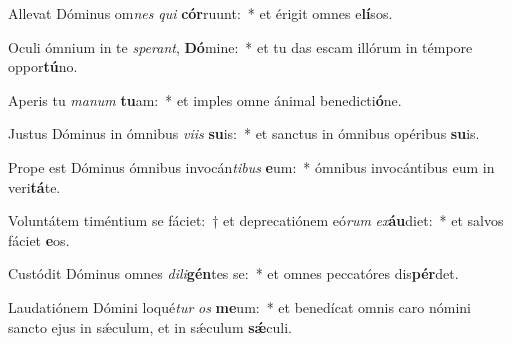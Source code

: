 \item Allevat Dóminus om\textit{nes} \textit{qui} \textbf{cór}ruunt:~* et érigit omnes e\textbf{lí}sos.
\item Oculi ómnium in te \textit{spe}\textit{rant}, \textbf{Dó}mine:~* et tu das escam illórum in témpore oppor\textbf{tú}no.
\item Aperis tu \textit{ma}\textit{num} \textbf{tu}am:~* et imples omne ánimal benedicti\textbf{ó}ne.
\item Justus Dóminus in ómnibus \textit{vi}\textit{is} \textbf{su}is:~* et sanctus in ómnibus opéribus \textbf{su}is.
\item Prope est Dóminus ómnibus invocán\textit{ti}\textit{bus} \textbf{e}um:~* ómnibus invocántibus eum in veri\textbf{tá}te.
\item Voluntátem timéntium se fáciet:~† et deprecatiónem eó\textit{rum} \textit{ex}\textbf{áu}diet:~* et salvos fáciet \textbf{e}os.
\item Custódit Dóminus omnes \textit{di}\textit{li}\textbf{gén}tes se:~* et omnes peccatóres dis\textbf{pér}det.
\item Laudatiónem Dómini loqué\textit{tur} \textit{os} \textbf{me}um:~* et benedícat omnis caro nómini sancto ejus in sǽculum, et in sǽculum \textbf{sǽ}culi.
